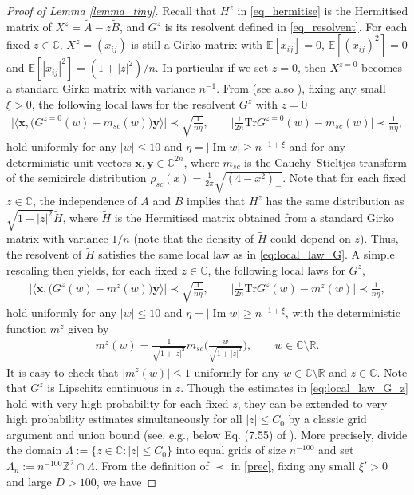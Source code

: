 \documentclass[10pt,reqno]{amsart}
\renewcommand{\Im}{\operatorname{Im}}
\newcommand{\R}{{\mathbb{R}}}
\newcommand{\C}{{\mathbb{C}}}
\newcommand{\wt}{\widetilde}
\newcommand{\<}{\langle}
\renewcommand{\>}{\rangle}
\numberwithin{equation}{section}
\begin{document}
\begin{proof}[Proof of Lemma \ref{lemma_tiny}]
	Recall that $H^{z}$ in \eqref{eq_hermitise} is the Hermitised matrix of $X^z=\wt{A}-z\wt{B}$, and $G^{z}$ is its resolvent defined in \eqref{eq_resolvent}. For each fixed $z\in \C$,  $X^z=(x_{ij})$ is still a Girko matrix with $\mathbb{E}[x_{ij}]=0$, $\mathbb{E}[(x_{ij})^2]=0$ and $\mathbb{E}[|x_{ij}|^2]=(1+|z|^2)/n$. In particular if we set $z=0$, then $X^{z=0}$ becomes a standard Girko matrix with variance $n^{-1}$.  From \cite[Theorem 1.1]{zbMATH06347297} (see also \cite{zbMATH06221300,zbMATH06261246,zbMATH06330939}), fixing any small $\xi>0$, the following local laws for the resolvent $G^{z}$ with $z=0$ 
	\begin{align}\label{eq:local_law_G}
		\Big| \big\langle \mathbf{x}, \big(G^{z=0}(w)-m_{sc}(w) \big)\mathbf{y} \big\rangle \Big|\prec \sqrt{
			\frac{1}{n \eta}}, \qquad \Big|\frac{1}{2n}  \mathrm{Tr}G^{z=0}(w)-m_{sc}(w)\Big|  \prec \frac{1}{n \eta},
	\end{align}
	hold uniformly for any $|w|\leq 10$ and $\eta=|\Im w| \geq n^{-1+\xi}$ and for any deterministic unit vectors $\mathbf{x}, \mathbf{y}\in \mathbb{C}^{2n}$, where $m_{sc}$ is the Cauchy--Stieltjes transform of the semicircle distribution $\rho_{sc}(x)=\frac{1}{2 \pi} \sqrt{(4-x^2)_+}$.  Note that for each fixed $z\in \C$, the independence of $A$ and $B$
    implies that $H^z$ 
    has the same distribution as $\sqrt{1+|z|^2} \tilde{H}$, where $\tilde{H}$ is the Hermitised matrix obtained from a standard Girko matrix with variance $1/n$ (note that the density of $\tilde H$ could depend on $z$). Thus, the resolvent of $\tilde{H}$ satisfies the same local law as in \eqref{eq:local_law_G}. A simple rescaling then yields, for each fixed $z\in \C$, the following local laws for $G^z$, 
	\begin{align}\label{eq:local_law_G_z}
		\Big| \big\langle \mathbf{x}, \big(G^z(w)-m^z(w)\big) \mathbf{y} \big\rangle \Big|  \prec \sqrt{
			\frac{1}{n \eta}}, \qquad \Big|\frac{1}{2n}  \mathrm{Tr}G^{z}(w)-m^z(w)\Big|  \prec \frac{1}{n\eta},
	\end{align}
	hold uniformly for any $|w|\leq 10$ and $\eta=|\Im w| \geq n^{-1+\xi}$, with the deterministic function $m^{z}$ given by
	\begin{align}\label{rho}
		m^{z}(w)=\frac{1}{\sqrt{1+|z|^2}} m_{sc}\Big( \frac{w}{\sqrt{1+|z|^2}}\Big), \qquad w\in \C \setminus \R.
	\end{align}
It is easy to check that $|m^{z}(w)| \leq 1$ uniformly for any $w \in \C \setminus \R$ and $z\in \C$. Note that $G^{z}$ is Lipschitz continuous in $z$. Though the estimates in \eqref{eq:local_law_G_z} hold with very high probability for each fixed $z$, they can be extended to very high probability estimates simultaneously for all $|z|\leq C_0$ by a classic grid argument and union bound (see, e.g., below Eq. (7.55) of \cite{zbMATH06780221}).  More precisely, divide the domain $\Lambda:=\{z\in \C: |z|\leq C_0\}$ into equal grids of size $n^{-100}$ and set $\Lambda_n:=n^{-100}\mathbb{Z}^2 \cap \Lambda$. From  the definition of $\prec$ in \eqref{prec}, fixing any small $\xi'>0$ and large $D>100$, we have 

\end{proof}
\end{document}
